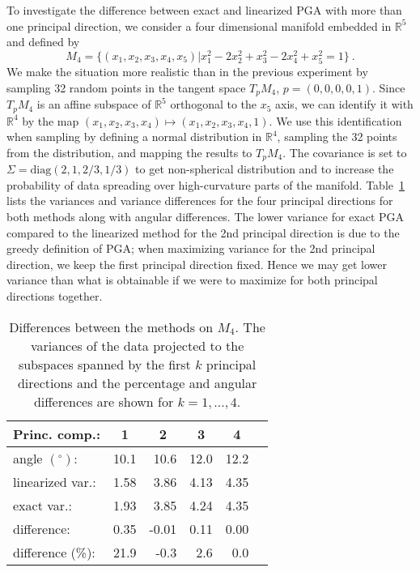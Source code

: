 \documentclass[final]{svjour3}
\newcommand{\RR}{\mathbb{R}}
\begin{document}
To investigate the difference between exact and linearized PGA with more than one principal direction, we consider
a four dimensional manifold embedded in $\RR^5$ and defined by
\begin{equation*}
    M_4=\{(x_1,x_2,x_3,x_4,x_5)|x_1^2-2x_2^2+x_3^2-2x_4^2+x_5^2=1\}
    \ .
\end{equation*}
We make the situation more realistic than in the previous experiment by 
sampling 32 random points in the tangent space $T_pM_4$, $p=(0,0,0,0,1)$. Since $T_pM_4$ is
an affine subspace of $\RR^5$ orthogonal to the $x_5$ axis, we can identify it with
$\RR^4$ by the map $(x_1,x_2,x_3,x_4)\mapsto(x_1,x_2,x_3,x_4,1)$. We use this
identification when sampling by defining a normal distribution in $\RR^4$,
sampling the 32 points from the distribution, and mapping the results to $T_pM_4$.
The covariance is set to
$\Sigma=\mbox{diag}(2,1,2/3,1/3)$ to get non-spherical distribution and to
increase the probability of data spreading over high-curvature parts of the
manifold. Table~\ref{table:low2} lists the variances and variance differences for 
the four principal directions for both methods along with angular differences. 
The lower variance for exact PGA compared to the linearized method for the
2nd principal direction is due to the greedy definition of PGA; when maximizing variance
for the 2nd principal direction, we keep the first principal direction
fixed. Hence we may get lower variance than what is obtainable if we were to maximize
for both principal directions together.
\begin{table}[ht]
\begin{center}
\begin{tabular}{lrrrrr}
  \hline
  \bf{Princ. comp.}: & \multicolumn{1}{c}{\bf{1}} & \multicolumn{1}{c}{\bf{2}} &
  \multicolumn{1}{c}{\bf{3}}& \multicolumn{1}{c}{\bf{4}} \\
  \hline
  angle $(^\circ)$:     & 10.1 & 10.6 & 12.0 & 12.2 \\
  linearized var.:         & 1.58 & 3.86 & 4.13 & 4.35 \\
  exact var.:           & 1.93 & 3.85 & 4.24 & 4.35 \\
  difference:           & 0.35 & -0.01 & 0.11 & 0.00 \\
  difference (\%):      & 21.9 & -0.3 & 2.6 & 0.0 \\
   \hline
\end{tabular}
\caption{Differences between the methods on $M_4$. The variances 
of the data projected to the subspaces spanned by the first $k$ principal 
directions and the percentage and angular differences are shown for $k=1,\ldots,4$.}
\label{table:low2}
\end{center}
\end{table}
\end{document}
